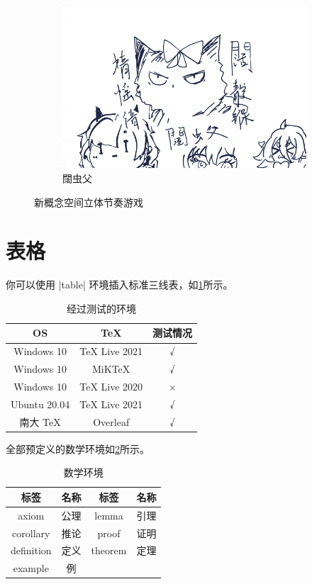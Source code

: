 \begin{figure}[htbp]
    \begin{subfigure}{.32\textwidth}
        \centering
        \includegraphics[width=\textwidth]{test.png}
        \caption{闊虫父}
    \end{subfigure}
    \caption{新概念空间立体节奏游戏}
\end{figure}
    
\section{表格}

你可以使用 |table| 环境插入标准三线表，如\cref{tab:testtab}所示。

\begin{table}[htbp]
    \centering
    \caption{经过测试的环境}
    \label{tab:testtab}
    \begin{tabular}{ccc}
        \toprule
        OS           & TeX           & 测试情况 \\
        \midrule
        Windows 10   & TeX Live 2021 & √        \\
        Windows 10   & MiKTeX        & √        \\
        Windows 10   & TeX Live 2020 & ×        \\
        Ubuntu 20.04 & TeX Live 2021 & √        \\
        南大 TeX     & Overleaf      & √        \\
        \bottomrule
    \end{tabular}
\end{table}

全部预定义的数学环境如\cref{tab:mathenv}所示。

\begin{table}[htbp]
    \centering
    \caption{数学环境}
    \label{tab:mathenv}
    \begin{tabular}{cc|cc}
        \toprule
        标签       & 名称 & 标签       & 名称 \\
        \midrule
        axiom      & 公理 & lemma      & 引理 \\
        corollary  & 推论 & proof      & 证明 \\
        definition & 定义 & theorem    & 定理 \\
        example    & 例   &            &      \\
        \bottomrule
    \end{tabular}
\end{table}
